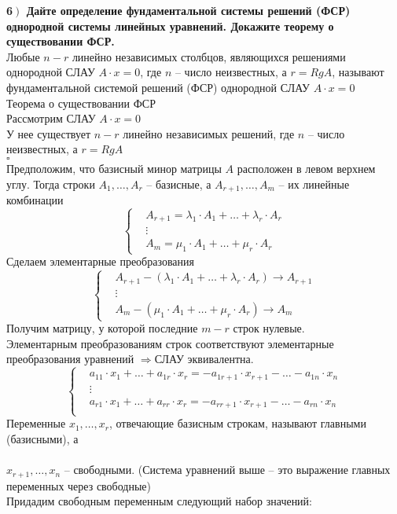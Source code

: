 \documentclass[a4paper,12pt]{article}
\begin{document}
    \textbf{6$\left.\right)$ Дайте определение фундаментальной системы решений (ФСР) однородной системы линейных уравнений. Докажите теорему о существовании ФСР.}\\Любые $n-r$ линейно независимых столбцов, являющихся решениями однородной СЛАУ $A\cdot x=0$, где $n$ -- число неизвестных, а $r=RgA$, называют фундаментальной системой решений (ФСР) однородной СЛАУ $A\cdot x=0$\\
    Теорема о существовании ФСР\\
    Рассмотрим СЛАУ $A\cdot x=0$\\
    У нее существует $n-r$ линейно независимых решений, где $n$ -- число неизвестных, а $r=RgA$\\
    $\square$\\
    Предположим, что базисный минор матрицы $A$ расположен в левом верхнем углу. Тогда строки $A_1, \ldots, A_r$ -- базисные, а $A_{r+1}, \ldots, A_m$ -- их линейные комбинации\\
    \[\left\{
    \begin{aligned}
        &A_{r+1}=\lambda_1\cdot A_1+\ldots+\lambda_r\cdot A_r\\
        &\vdots\\
        &A_m=\mu_1\cdot A_1+\ldots+\mu_r\cdot A_r
    \end{aligned}\right.
    \]
    Сделаем элементарные преобразования\
    \[\left\{
    \begin{aligned}
        &A_{r+1}-(\lambda_1\cdot A_1+\ldots+\lambda_r\cdot A_r)\rightarrow A_{r+1}\\
        &\vdots\\
        &A_m-(\mu_1\cdot A_1+\ldots+\mu_r\cdot A_r)\rightarrow A_m
    \end{aligned}\right.
    \]
    Получим матрицу, у которой последние $m-r$ строк нулевые.\\
    Элементарным преобразованиям строк соответствуют элементарные преобразования уравнений $\Rightarrow$СЛАУ эквивалентна.\\
    \[\left\{
    \begin{aligned}
        &a_{11}\cdot x_1+\ldots+a_{1r}\cdot x_r=-a_{1r+1}\cdot x_{r+1}-\ldots-a_{1n}\cdot x_n\\
        &\vdots\\
        &a_{r1}\cdot x_1+\ldots+a_{rr}\cdot x_r=-a_{rr+1}\cdot x_{r+1}-\ldots-a_{rn}\cdot x_n\\
    \end{aligned}\right.
    \]
    Переменные $x_1, \ldots, x_r$, отвечающие базисным строкам, называют главными (базисными), а\\
    \\
    $x_{r+1}, \ldots, x_n$ -- свободными. (Система уравнений выше -- это выражение главных переменных через свободные)\\
    Придадим свободным переменным следующий набор значений:
\end{document}
